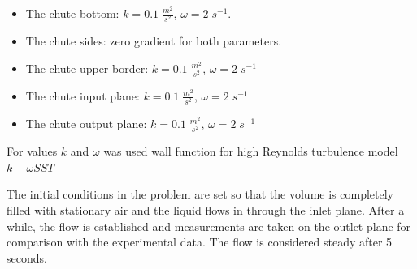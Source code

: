 \documentclass[sensors,article,submit,moreauthors,pdftex]{Definitions/mdpi}
\begin{document}
\begin{itemize}
    \item The chute bottom: $k=0.1\;\frac{m^2}{s^2}$, $\omega = 2 \; s^{-1}$.
    \item The chute sides: zero gradient for both parameters.
    \item The chute upper border: $k=0.1\;\frac{m^2}{s^2}$, $\omega = 2 \; s^{-1}$
    \item The chute input plane: $k=0.1\;\frac{m^2}{s^2}$, $\omega = 2 \; s^{-1}$
    \item The chute output plane: $k=0.1\;\frac{m^2}{s^2}$, $\omega = 2 \; s^{-1}$
\end{itemize}


For values $k$ and $\omega$ was used wall function for high Reynolds turbulence model $k-\omega SST$

The initial conditions in the problem are set so that the volume is completely filled with stationary air and the liquid flows in through the inlet plane. After a while, the flow is established and measurements are taken on the outlet plane for comparison with the experimental data. The flow is considered steady after 5 seconds.









\end{document}
